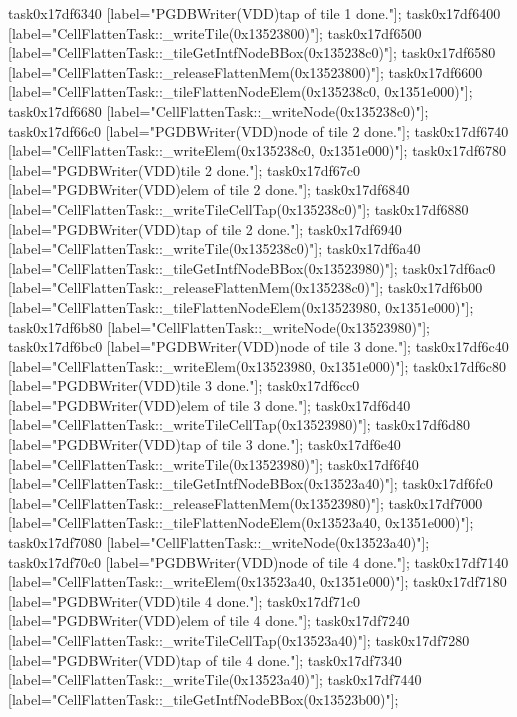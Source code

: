 {	task0x17df6340 [label="PGDBWriter(VDD)\nCell tap of tile 1 done."];
	task0x17df6400 [label="CellFlattenTask::_writeTile(0x13523800)"];
	task0x17df6500 [label="CellFlattenTask::_tileGetIntfNodeBBox(0x135238c0)"];
	task0x17df6580 [label="CellFlattenTask::_releaseFlattenMem(0x13523800)"];
	task0x17df6600 [label="CellFlattenTask::_tileFlattenNodeElem(0x135238c0, 0x1351e000)"];
	task0x17df6680 [label="CellFlattenTask::_writeNode(0x135238c0)"];
	task0x17df66c0 [label="PGDBWriter(VDD)\nCell node of tile 2 done."];
	task0x17df6740 [label="CellFlattenTask::_writeElem(0x135238c0, 0x1351e000)"];
	task0x17df6780 [label="PGDBWriter(VDD)\nCell tile 2 done."];
	task0x17df67c0 [label="PGDBWriter(VDD)\nCell elem of tile 2 done."];
	task0x17df6840 [label="CellFlattenTask::_writeTileCellTap(0x135238c0)"];
	task0x17df6880 [label="PGDBWriter(VDD)\nCell tap of tile 2 done."];
	task0x17df6940 [label="CellFlattenTask::_writeTile(0x135238c0)"];
	task0x17df6a40 [label="CellFlattenTask::_tileGetIntfNodeBBox(0x13523980)"];
	task0x17df6ac0 [label="CellFlattenTask::_releaseFlattenMem(0x135238c0)"];
	task0x17df6b00 [label="CellFlattenTask::_tileFlattenNodeElem(0x13523980, 0x1351e000)"];
	task0x17df6b80 [label="CellFlattenTask::_writeNode(0x13523980)"];
	task0x17df6bc0 [label="PGDBWriter(VDD)\nCell node of tile 3 done."];
	task0x17df6c40 [label="CellFlattenTask::_writeElem(0x13523980, 0x1351e000)"];
	task0x17df6c80 [label="PGDBWriter(VDD)\nCell tile 3 done."];
	task0x17df6cc0 [label="PGDBWriter(VDD)\nCell elem of tile 3 done."];
	task0x17df6d40 [label="CellFlattenTask::_writeTileCellTap(0x13523980)"];
	task0x17df6d80 [label="PGDBWriter(VDD)\nCell tap of tile 3 done."];
	task0x17df6e40 [label="CellFlattenTask::_writeTile(0x13523980)"];
	task0x17df6f40 [label="CellFlattenTask::_tileGetIntfNodeBBox(0x13523a40)"];
	task0x17df6fc0 [label="CellFlattenTask::_releaseFlattenMem(0x13523980)"];
	task0x17df7000 [label="CellFlattenTask::_tileFlattenNodeElem(0x13523a40, 0x1351e000)"];
	task0x17df7080 [label="CellFlattenTask::_writeNode(0x13523a40)"];
	task0x17df70c0 [label="PGDBWriter(VDD)\nCell node of tile 4 done."];
	task0x17df7140 [label="CellFlattenTask::_writeElem(0x13523a40, 0x1351e000)"];
	task0x17df7180 [label="PGDBWriter(VDD)\nCell tile 4 done."];
	task0x17df71c0 [label="PGDBWriter(VDD)\nCell elem of tile 4 done."];
	task0x17df7240 [label="CellFlattenTask::_writeTileCellTap(0x13523a40)"];
	task0x17df7280 [label="PGDBWriter(VDD)\nCell tap of tile 4 done."];
	task0x17df7340 [label="CellFlattenTask::_writeTile(0x13523a40)"];
	task0x17df7440 [label="CellFlattenTask::_tileGetIntfNodeBBox(0x13523b00)"];
}
